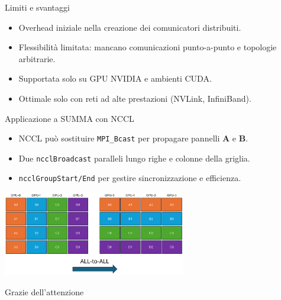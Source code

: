 \documentclass{beamer}
\begin{document}
\begin{frame}{Limiti e svantaggi}
    \begin{itemize}
        \item Overhead iniziale nella creazione dei comunicatori distribuiti.
        \item Flessibilità limitata: mancano comunicazioni punto-a-punto e topologie arbitrarie.
        \item Supportata solo su GPU NVIDIA e ambienti CUDA.
        \item Ottimale solo con reti ad alte prestazioni (NVLink, InfiniBand).
    \end{itemize}
\end{frame}

\begin{frame}{Applicazione a SUMMA con NCCL}
    \begin{itemize}
        \item NCCL può sostituire \texttt{MPI\_Bcast} per propagare pannelli $\mathbf{A}$ e $\mathbf{B}$.
        \item Due \texttt{ncclBroadcast} paralleli lungo righe e colonne della griglia.
        \item \texttt{ncclGroupStart/End} per gestire sincronizzazione e efficienza.
    \end{itemize}

    \includegraphics[width=0.6\textwidth]{imgs/summa_nccl.png}
\end{frame}

\begin{frame}
    \centering \Huge
    Grazie dell'attenzione
\end{frame}
\end{document}
